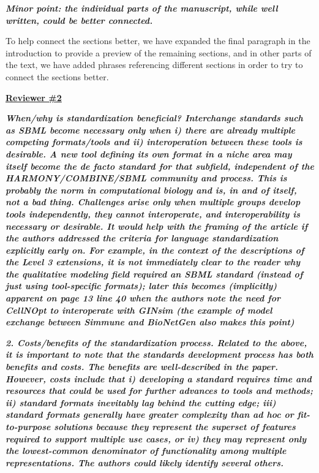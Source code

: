 \documentclass[11pt]{mhletter}
\begin{document}
\textbf{\textit{Minor point: the individual parts of the manuscript, while well written, could be better connected.}}

To help connect the sections better, we have expanded the final paragraph in the introduction to provide a preview of the remaining sections, and in other parts of the text, we have added phrases referencing different sections in order to try to connect the sections better.


\clearpage
\textbf{\underline{Reviewer \#2}}

\textbf{\textit{When/why is standardization beneficial? Interchange standards such as SBML become necessary only when i) there are already multiple competing formats/tools and ii) interoperation between these tools is desirable. A new tool defining its own format in a niche area may itself become the de facto standard for that subfield, independent of the HARMONY/COMBINE/SBML community and process. This is probably the norm in computational biology and is, in and of itself, not a bad thing. Challenges arise only when multiple groups develop tools independently, they cannot interoperate, and interoperability is necessary or desirable. It would help with the framing of the article if the authors addressed the criteria for language standardization explicitly early on. For example, in the context of the descriptions of the Level 3 extensions, it is not immediately clear to the reader why the qualitative modeling field required an SBML standard (instead of just using tool-specific formats); later this becomes (implicitly) apparent on page 13 line 40 when the authors note the need for CellNOpt to interoperate with GINsim (the example of model exchange between Simmune and BioNetGen also makes this point)}}



\textbf{\textit{2. Costs/benefits of the standardization process. Related to the above, it is important to note that the standards development process has both benefits and costs. The benefits are well-described in the paper. However, costs include that i) developing a standard requires time and resources that could be used for further advances to tools and methods; ii) standard formats inevitably lag behind the cutting edge; iii) standard formats generally have greater complexity than ad hoc or fit-to-purpose solutions because they represent the superset of features required to support multiple use cases, or iv) they may represent only the lowest-common denominator of functionality among multiple representations. The authors could likely identify several others.}}
\end{document}
